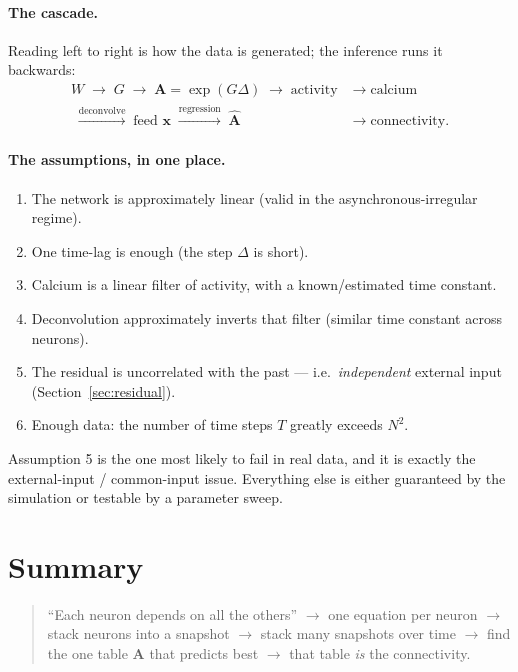 \documentclass[11pt,a4paper]{article}
\newcommand{\xx}{\mathbf{x}}
\newcommand{\Amat}{\mathbf{A}}
\begin{document}
\paragraph{The cascade.}
Reading left to right is how the data is generated; the inference runs it
backwards:
\[
\begin{aligned}
W \;\to\; G \;\to\; \Amat=\exp(G\Delta) \;\to\; \text{activity}
\;&\to\; \text{calcium}\\[-2pt]
\;\xrightarrow{\text{deconvolve}}\; \text{feed }\xx
\;\xrightarrow{\text{regression}}\; \widehat{\Amat} \;&\to\; \text{connectivity.}
\end{aligned}
\]

\paragraph{The assumptions, in one place.}
\begin{enumerate}
\item The network is approximately linear (valid in the asynchronous-irregular regime).
\item One time-lag is enough (the step $\Delta$ is short).
\item Calcium is a linear filter of activity, with a known/estimated time constant.
\item Deconvolution approximately inverts that filter (similar time constant across neurons).
\item The residual is uncorrelated with the past --- i.e.\ \emph{independent} external input (Section~\ref{sec:residual}).
\item Enough data: the number of time steps $T$ greatly exceeds $N^2$.
\end{enumerate}
Assumption 5 is the one most likely to fail in real data, and it is exactly the
external-input / common-input issue. Everything else is either guaranteed by the
simulation or testable by a parameter sweep.

\section*{Summary}

\begin{quote}
``Each neuron depends on all the others'' $\to$ one equation per neuron $\to$
stack neurons into a snapshot $\to$ stack many snapshots over time $\to$ find the
one table $\Amat$ that predicts best $\to$ that table \emph{is} the connectivity.
\end{quote}
\end{document}
